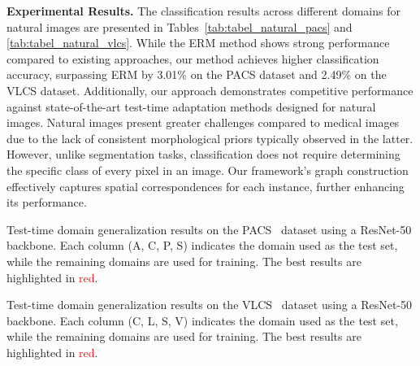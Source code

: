 \noindent \textbf{Experimental Results.} The classification results across different domains for natural images are presented in Tables~\ref{tab:tabel_natural_pacs} and \ref{tab:tabel_natural_vlcs}. While the ERM method shows strong performance compared to existing approaches, our method achieves higher classification accuracy, surpassing ERM by 3.01\% on the PACS dataset and 2.49\% on the VLCS dataset. Additionally, our approach demonstrates competitive performance against state-of-the-art test-time adaptation methods designed for natural images. Natural images present greater challenges compared to medical images due to the lack of consistent morphological priors typically observed in the latter. However, unlike segmentation tasks, classification does not require determining the specific class of every pixel in an image. Our framework’s graph construction effectively captures spatial correspondences for each instance, further enhancing its performance.

\begin{table}[h!]
\centering
  \caption{Test-time domain generalization results on the PACS~\cite{li2017deeper} dataset using a ResNet-50 backbone. Each column (A, C, P, S) indicates the domain used as the test set, while the remaining domains are used for training. The best results are highlighted in \textcolor{red}{red}.}
  \begin{adjustbox}{width=0.969\linewidth}
    
  \end{adjustbox}
  \label{tab:tabel_natural_pacs}
\end{table}

\begin{table}[h!]
\centering
  \caption{Test-time domain generalization results on the VLCS~\cite{fang2013unbiased} dataset using a ResNet-50 backbone. Each column (C, L, S, V) indicates the domain used as the test set, while the remaining domains are used for training. The best results are highlighted in \textcolor{red}{red}.}
  \begin{adjustbox}{width=0.969\linewidth}
    
  \end{adjustbox}
  \label{tab:tabel_natural_vlcs}
\end{table}


